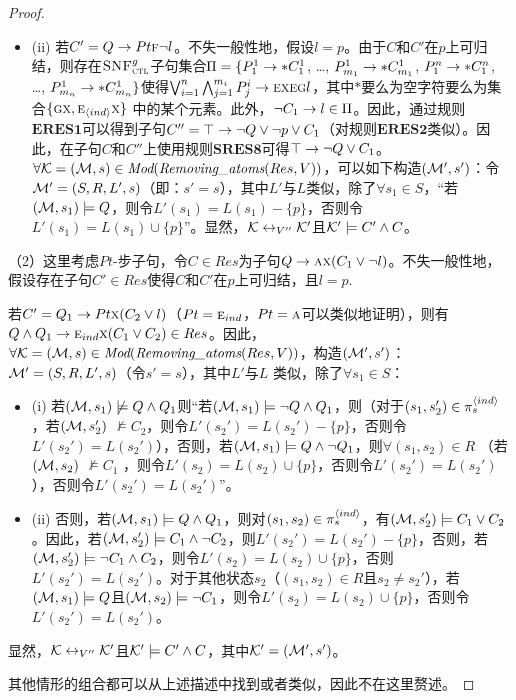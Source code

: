 \begin{proof}
\begin{itemize}
\begin{itemize}
		\item[] (ii) 若$C' =  Q\rightarrow Pt \textsc{f} \neg l$。不失一般性地，假设$l=p$。由于$C$和$C'$在$p$上可归结，则存在${\textsc{SNF}_{\textsc{ctl}}^g}$子句集合$\Pi=\{P_1^1 \rightarrow * C_1^1$, \dots, $P_{m_1}^1 \rightarrow * C_{m_1}^1$, $P_1^n \rightarrow * C_1^n$, \dots, $P_{m_n}^1 \rightarrow * C_{m_n}^1 \}$使得$\bigvee_{i=1}^n \bigwedge_{j=1}^{m_i} P_j^i \rightarrow \textsc{e} \textsc{x} \textsc{e} \textsc{g} l$，其中$*$要么为空字符要么为集合$\{\textsc{g} \textsc{x}, \textsc{e}_{{\langle{ind}\rangle}} \textsc{x}\}$ 中的某个元素。此外，$\neg C_1 \rightarrow l\in \Pi$。因此，通过规则$\textbf{ERES1}$可以得到子句$C''=\top \rightarrow \neg Q \vee \neg p \vee C_1$（对规则$\textbf{ERES2}$类似）。因此，在子句$C$和$C''$上使用规则$\textbf{SRES8}$可得$\top \rightarrow \neg Q \vee C_1$。$\forall {\cal K}=({\cal M}, s)\in \textit{Mod}(\emph{Removing\_atoms}(Res, V))$，可以如下构造$({\cal M}',s')$：令${\cal M}'= (S, R, L',s)$（即：$s'=s$），其中$L'$与$L$类似，除了$\forall s_1\in S$，“若$({\cal M}, s_1) \models Q$，则令$L'(s_1) = L(s_1) - \{p\}$，否则令$L'(s_1) = L(s_1) \cup \{p\}$”。显然，${\cal K} \leftrightarrow_{V''} {\cal K}'$且${\cal K}' \models C' \wedge C$。  
	\end{itemize}
\end{itemize}

（2）这里考虑$Pt$-步子句，令$C\in Res$为子句$Q \rightarrow \textsc{a} \textsc{x}(C_1 \vee \neg l)$。不失一般性地，假设存在子句$C'\in Res$使得$C$和$C'$在$p$上可归结，且$l=p$.

若$C'= Q_1\rightarrow Pt \textsc{x} (C_2 \vee l)$（$Pt=\textsc{e}_{ind}$，$Pt = \textsc{a}$可以类似地证明），则有$Q \wedge Q_1 \rightarrow \textsc{e}_{ind} \textsc{x}(C_1 \vee C_2) \in Res$。因此，$\forall {\cal K}=({\cal M}, s)\in \textit{Mod}(\emph{Removing\_atoms}(Res, V))$，构造$({\cal M}',s')$：${\cal M}'= (S, R, L',s)$（令$s'=s$），其中$L'$与$L$ 类似，除了$\forall s_1\in S$：
\begin{itemize}
	\item[] (i) 若$({\cal M}, s_1) \not \models Q \wedge Q_1$则“若$({\cal M}, s_1) \models \neg Q \wedge Q_1$，则（对于$(s_1, s_2') \in \pi_s^{{\langle{ind}\rangle}}$，若$({\cal M}, s_2')$ $\not \models C_2$，则令$L'(s_2') = L(s_2') - \{p\}$，否则令$L'(s_2') = L(s_2')$），否则，若$({\cal M}, s_1) \models Q \wedge \neg Q_1$，则$\forall (s_1, s_2) \in R$ （若$({\cal M}, s_2)$ $\not \models C_1$ ，则令$L'(s_2) = L(s_2) \cup \{p\}$，否则令$L'(s_2') = L(s_2')$），否则令$L'(s_2') = L(s_2')$”。
	\item[] (ii) 否则，若$({\cal M}, s_1) \models Q \wedge Q_1$，则对$(s_1, s_2) \in \pi_s^{{\langle{ind}\rangle}}$，有$({\cal M},s_2') \models C_1 \vee C_2$。因此，若$({\cal M}, s_2') \models C_1 \wedge \neg C_2$，则$L'(s_2') = L(s_2') - \{p\}$，否则，若$({\cal M}, s_2') \models \neg C_1 \wedge C_2$，则令$L'(s_2) = L(s_2) \cup \{p\}$，否则$L'(s_2') = L(s_2')$。对于其他状态$s_2$（$(s_1, s_2) \in R$且$s_2 \not = s_2'$），若$({\cal M}, s_1) \models Q$且$({\cal M}, s_2) \models \neg C_1$，则令$L'(s_2) = L(s_2) \cup \{p\}$，否则令$L'(s_2') = L(s_2')$。
\end{itemize}
显然，${\cal K} \leftrightarrow_{V''} {\cal K}'$且${\cal K}' \models C' \wedge C$，其中${\cal K}' = ({\cal M}',s')$。 

其他情形的组合都可以从上述描述中找到或者类似，因此不在这里赘述。
\end{proof}


